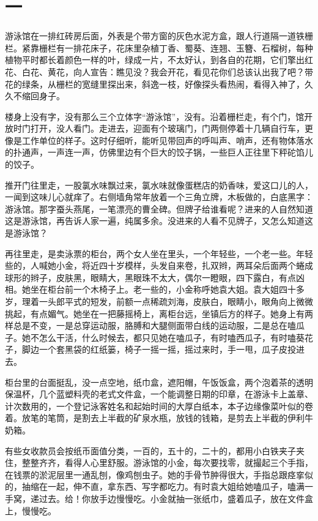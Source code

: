 \documentclass[lang=cn,newtx,12pt,scheme=chinese]{elegantbook}
\begin{document}
\section{一}
游泳馆在一排红砖房后面，外表是个带方窗的灰色水泥方盒，跟人行道隔一道铁栅栏。紧靠栅栏有一排花床子，花床里杂植丁香、蜀葵、连翘、玉簪、石榴树，每种植物平时都长着颜色一样的叶，绿成一片，不太好认，到各自的花期，它们擎出红花、白花、黄花，向人宣告：瞧见没？我会开花，看见花你们总该认出我了吧？带花的绿条，从栅栏的宽缝里探出来，斜逸一枝，好像探头看热闹，看得入神了，久久不缩回身子。

楼身上没有字，没有那么三个立体字“游泳馆”，没有。沿着栅栏走，有个门，馆开放时门打开，没人看门。走进去，迎面有个玻璃门，门两侧停着十几辆自行车，更像是工作单位的样子。这时仔细听，能听见带回声的呼叫声、哨声，还有物体落水的扑通声，一声连一声，仿佛里边有个巨大的饺子锅，一些巨人正往里下秤砣馅儿的饺子。

推开门往里走，一股氯水味飘过来，氯水味就像蛋糕店的奶香味，爱这口儿的人，一闻到这味儿心就痒了。右侧墙角常年放着一个三角立牌，木板做的，白底黑字：游泳馆。那字蚕头燕尾，一笔漂亮的曹全碑。但牌子给谁看呢？进来的人自然知道这是游泳馆，再告诉人家一遍，纯属多余。没进来的人看不见牌子，又怎么知道这是游泳馆？

再往里走，是卖泳票的柜台，两个女人坐在里头，一个年轻些，一个老一些。年轻些的，人喊她小金，将近四十岁模样，头发自来卷，扎双辫，两耳朵后面两个蜷成球形的辫子，皮肤黑，眼睛大，黑眼珠不太大，偶尔一瞪眼，四下露白，有点凶相。她坐在柜台前一个木椅子上。老一些的，小金称呼她袁大姐。袁大姐四十多岁，理着一头郎平式的短发，前额一点稀疏刘海，皮肤白，眼睛小，眼角向上微微挑起，有点媚气。她坐在一把藤摇椅上，离柜台远，坐镇后方的样子。她身上有两样总是不变，一是总穿运动服，胳膊和大腿侧面带白线的运动服，二是总在嗑瓜子。她不怎么干活，什么时候去，都只见她在嗑瓜子，有时嗑西瓜子，有时嗑葵花子，脚边一个套黑袋的红纸篓，椅子一摇一摇，摇过来时，手一甩，瓜子皮投进去。

柜台里的台面挺乱，没一点空地，纸巾盒，遮阳帽，午饭饭盒，两个泡着茶的透明保温杯，几个蓝塑料壳的老式文件盒，一个能调整日期的印章，在游泳卡上盖章、计次数用的，一个登记泳客姓名和起始时间的大厚白纸本，本子边缘像菜叶似的卷着。放笔的笔筒，是割去上半截的矿泉水瓶，放钱的钱箱，是剪去上半截的伊利牛奶箱。

有些女收款员会按纸币面值分类，一百的，五十的，二十的，都用小白铁夹子夹住，整整齐齐，看得人心里舒服。游泳馆的小金，每次要找零，就撮起三个手指，在钱票的淤泥层里一通乱刨，像鸡刨虫子。她的手骨节肿得很大，手指总跟痉挛似的，抽缩在一起，伸不直，拿东西、写字都吃力。有时袁大姐给她嗑瓜子，嗑满一手窝，递过去。给！你放手边慢慢吃。小金就抽一张纸巾，盛着瓜子，放在文件盒上，慢慢吃。
\end{document}
